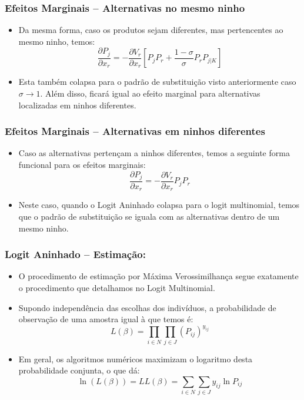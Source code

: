 \documentclass{beamer}
\begin{document}
\begin{frame}\frametitle{Efeitos Marginais -- Alternativas no mesmo ninho}

\begin{itemize}
\item Da mesma forma, caso os produtos sejam diferentes, mas pertencentes
ao mesmo ninho, temos:
\[
\frac{\partial P_{j}}{\partial x_{r}}=-\frac{\partial V_{r}}{\partial x_{r}}\left[P_{j}P_{r}+\frac{1-\sigma}{\sigma}P_{r}P_{j|K}\right]
\]
\item Esta também colapsa para o padrão de substituição visto anteriormente
caso $\sigma\rightarrow1$. Além disso, ficará igual ao efeito marginal
para alternativas localizadas em ninhos diferentes.
\end{itemize}
\end{frame}

\begin{frame}\frametitle{Efeitos Marginais -- Alternativas em ninhos diferentes}

\begin{itemize}
\item Caso as alternativas pertençam a ninhos diferentes, temos a seguinte
forma funcional para os efeitos marginais:
\[
\frac{\partial P_{j}}{\partial x_{r}}=-\frac{\partial V_{r}}{\partial x_{r}}P_{j}P_{r}
\]
\item Neste caso, quando o Logit Aninhado colapsa para o logit multinomial,
temos que o padrão de substituição se iguala com as alternativas dentro
de um mesmo ninho.
\end{itemize}
\end{frame}


\begin{frame}\frametitle{Logit Aninhado -- Estimação:}

\begin{itemize}
\item O procedimento de estimação por Máxima Verossimilhança segue exatamente
o procedimento que detalhamos no Logit Multinomial.
\item Supondo independência das escolhas dos indivíduos, a probabilidade
de observação de uma amostra igual à que temos é:
\[
L(\beta)=\prod_{i\in N}\prod_{j\in J}(P_{ij})^{y_{ij}}
\]
\item Em geral, os algoritmos numéricos maximizam o logaritmo desta probabilidade
conjunta, o que dá:
\[
\ln(L(\beta))=LL(\beta)=\sum_{i\in N}\sum_{j\in J}y_{ij}\ln P_{ij}
\]
\end{itemize}
\end{frame}

\end{document}
